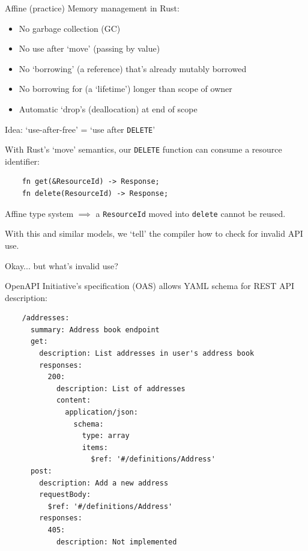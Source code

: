 \documentclass[10pt]{beamer}
\begin{document}
\begin{frame}{Affine (practice)}
    Memory management in Rust\pause:
    \begin{itemize}[<+->]
        \item No garbage collection (GC)
        \item No use after `move' (passing by value)
        \item No `borrowing' (a reference) that's already mutably borrowed
        \item No borrowing for (a `lifetime') longer than scope of owner
        \item Automatic `drop's (deallocation) at end of scope 
    \end{itemize}
\end{frame}

\begin{frame}[fragile]{Idea: `use-after-free' = `use after \texttt{DELETE}'}

    With Rust's `move' semantics, our \texttt{DELETE} function can consume a resource identifier\pause:
    \begin{verbatim}
    fn get(&ResourceId) -> Response;
    fn delete(ResourceId) -> Response;
    \end{verbatim}

    \pause
    Affine type system $\implies$ a \texttt{ResourceId} moved into \texttt{delete} cannot be reused.
    
    \pause
    With this and similar models, we `tell' the compiler how to check for invalid API use.
    
\end{frame}

\begin{frame}[fragile]{Okay... but what's invalid use?}

    OpenAPI Initiative's specification (OAS) allows YAML schema for REST API description\pause:
    \begin{verbatim}
    /addresses:
      summary: Address book endpoint
      get:
        description: List addresses in user's address book
        responses:
          200:
            description: List of addresses
            content:
              application/json:
                schema:
                  type: array
                  items:
                    $ref: '#/definitions/Address' 
      post:
        description: Add a new address
        requestBody:
          $ref: '#/definitions/Address'
        responses:
          405:
            description: Not implemented
    \end{verbatim}

\end{frame}
\end{document}
